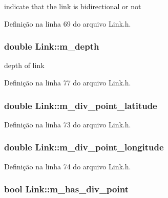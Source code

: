 indicate that the link is bidirectional or not 



Definição na linha 69 do arquivo Link.\+h.

\subsubsection[{m\+\_\+depth}]{\setlength{\rightskip}{0pt plus 5cm}double Link\+::m\+\_\+depth\hspace{0.3cm}{\ttfamily [protected]}}\label{class_link_a521ae4140f7b10c40f69f5895f48a62c}


depth of link 



Definição na linha 77 do arquivo Link.\+h.

\subsubsection[{m\+\_\+div\+\_\+point\+\_\+latitude}]{\setlength{\rightskip}{0pt plus 5cm}double Link\+::m\+\_\+div\+\_\+point\+\_\+latitude\hspace{0.3cm}{\ttfamily [protected]}}\label{class_link_a0727d1e8c7e0ef0d4ceddd7799605ed0}


Definição na linha 73 do arquivo Link.\+h.

\subsubsection[{m\+\_\+div\+\_\+point\+\_\+longitude}]{\setlength{\rightskip}{0pt plus 5cm}double Link\+::m\+\_\+div\+\_\+point\+\_\+longitude\hspace{0.3cm}{\ttfamily [protected]}}\label{class_link_a609c3e894af74682573dbc1e12592e68}


Definição na linha 74 do arquivo Link.\+h.

\subsubsection[{m\+\_\+has\+\_\+div\+\_\+point}]{\setlength{\rightskip}{0pt plus 5cm}bool Link\+::m\+\_\+has\+\_\+div\+\_\+point\hspace{0.3cm}{\ttfamily [protected]}}\label{class_link_a88194c2ee75fc8a2fef1bf9fbe0d8cab}


